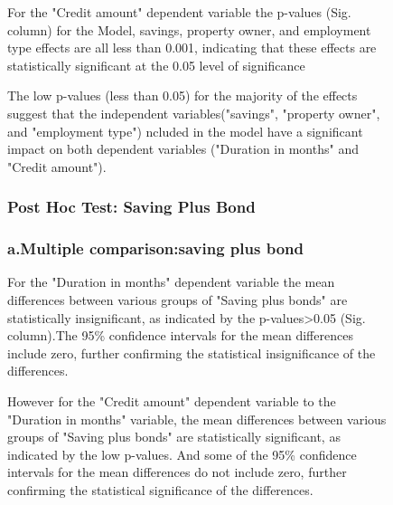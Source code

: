 \documentclass[english,10pt,a4paper]{article}
\begin{document}
\begin{figure}[h]
For the "Credit amount" dependent variable the p-values (Sig. column) for the Model, savings, property owner, and employment type effects are all less than 0.001, indicating that these effects are statistically significant at the 0.05 level of significance

The low p-values (less than 0.05) for the majority of the effects suggest that the independent variables("savings", "property owner", and "employment type") ncluded in the model  have a significant impact on both dependent variables ("Duration in months" and "Credit amount").

\subsubsection*{Post Hoc Test: Saving Plus Bond}
	\subsubsection*{a.Multiple comparison:saving plus bond}
	
	For the "Duration in months" dependent variable the mean differences between various groups of "Saving plus bonds" are statistically insignificant, as indicated by the  p-values>0.05 (Sig. column).The 95\% confidence intervals for the mean differences include zero, further confirming the statistical insignificance of the differences.
	
	
	However for the "Credit amount" dependent variable to the "Duration in months" variable, the mean differences between various groups of "Saving plus bonds" are statistically significant, as indicated by the low p-values. And some of the 95\% confidence intervals for the mean differences do not include zero, further confirming the statistical significance of the differences.
	
	
\end{figure}
\end{document}
